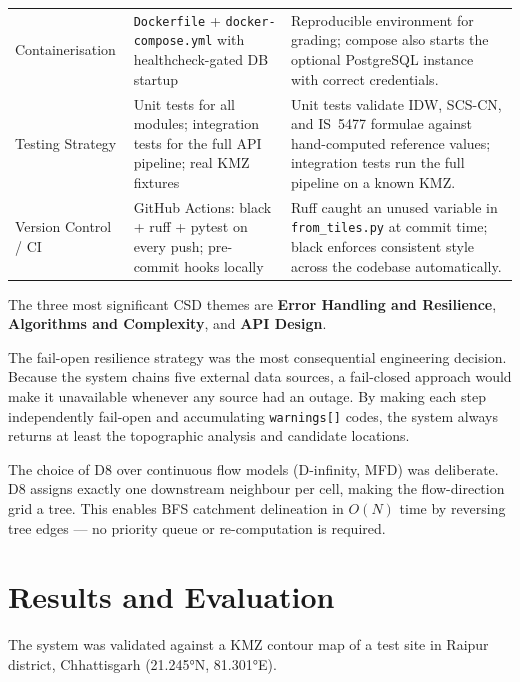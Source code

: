 \documentclass[manuscript,screen,review,nonacm]{acmart}
\begin{document}
\begin{table}[t]
\begin{tabular}{p{2.8cm}p{5.2cm}p{6.5cm}}
    Containerisation & \texttt{Dockerfile} + \texttt{docker-compose.yml} with healthcheck-gated DB startup & Reproducible environment for grading; compose also starts the optional PostgreSQL instance with correct credentials. \\
    Testing Strategy & Unit tests for all modules; integration tests for the full API pipeline; real KMZ fixtures & Unit tests validate IDW, SCS-CN, and IS~5477 formulae against hand-computed reference values; integration tests run the full pipeline on a known KMZ. \\
    Version Control / CI & GitHub Actions: black + ruff + pytest on every push; pre-commit hooks locally & Ruff caught an unused variable in \texttt{from\_tiles.py} at commit time; black enforces consistent style across the codebase automatically. \\
    \bottomrule
  \end{tabular}
\end{table}

The three most significant CSD themes are \textbf{Error Handling and
Resilience}, \textbf{Algorithms and Complexity}, and \textbf{API Design}.

The fail-open resilience strategy was the most consequential engineering
decision. Because the system chains five external data sources, a
fail-closed approach would make it unavailable whenever any source had an
outage. By making each step independently fail-open and accumulating
\texttt{warnings[]} codes, the system always returns at least the
topographic analysis and candidate locations.

The choice of D8 over continuous flow models (D-infinity, MFD) was
deliberate. D8 assigns exactly one downstream neighbour per cell, making
the flow-direction grid a tree. This enables BFS catchment delineation in
$O(N)$ time by reversing tree edges --- no priority queue or
re-computation is required.

\section{Results and Evaluation}
\label{sec:results}

The system was validated against a KMZ contour map of a test site in
Raipur district, Chhattisgarh (21.245°N, 81.301°E).
\end{document}
